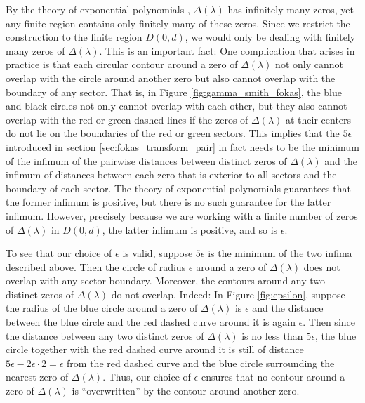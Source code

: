 \documentclass[12pt, oneside, a4paper]{article}
\begin{document}
By the theory of exponential polynomials \cite{Langer1931}, $\Delta(\lambda)$ has infinitely many zeros, yet any finite region contains only finitely many of these zeros. Since we restrict the construction to the finite region $D(0, d)$, we would only be dealing with finitely many zeros of $\Delta(\lambda)$. This is an important fact: One complication that arises in practice is that each circular contour around a zero of $\Delta(\lambda)$ not only cannot overlap with the circle around another zero but also cannot overlap with the boundary of any sector. That is, in Figure \ref{fig:gamma_smith_fokas}, the blue and black circles not only cannot overlap with each other, but they also cannot overlap with the red or green dashed lines if the zeros of $\Delta(\lambda)$ at their centers do not lie on the boundaries of the red or green sectors. This implies that the $5\epsilon$ introduced in section \ref{sec:fokas_transform_pair} in fact needs to be the minimum of the infimum of the pairwise distances between distinct zeros of $\Delta(\lambda)$ and the infimum of distances between each zero that is exterior to all sectors and the boundary of each sector. The theory of exponential polynomials \cite{Langer1931} guarantees that the former infimum is positive, but there is no such guarantee for the latter infimum. However, precisely because we are working with a finite number of zeros of $\Delta(\lambda)$ in $D(0, d)$, the latter infimum is positive, and so is $\epsilon$. 

To see that our choice of $\epsilon$ is valid, suppose $5\epsilon$ is the minimum of the two infima described above. Then the circle of radius $\epsilon$ around a zero of $\Delta(\lambda)$ does not overlap with any sector boundary. Moreover, the contours around any two distinct zeros of $\Delta(\lambda)$ do not overlap. Indeed: In Figure \ref{fig:epsilon}, suppose the radius of the blue circle around a zero of $\Delta(\lambda)$ is $\epsilon$ and the distance between the blue circle and the red dashed curve around it is again $\epsilon$. Then since the distance between any two distinct zeros of $\Delta(\lambda)$ is no less than $5\epsilon$, the blue circle together with the red dashed curve around it is still of distance $5\epsilon-2\epsilon\cdot 2 = \epsilon$ from the red dashed curve and the blue circle surrounding the nearest zero of $\Delta(\lambda)$. Thus, our choice of $\epsilon$ ensures that no contour around a zero of $\Delta(\lambda)$ is ``overwritten'' by the contour around another zero.
\end{document}
